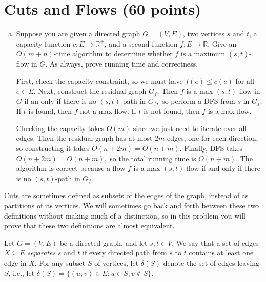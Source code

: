 \documentclass{article}
\begin{document}
\section{Cuts and Flows (60 points)}

\begin{enumerate}[(a)]
	\item Suppose you are given a directed graph $G = (V, E)$, two vertices $s$ and $t$, a capacity function $c: E \rightarrow \mathbb{R}^+$, and a second function $f : E \rightarrow \mathbb{R}$. Give an $O(m+n)$-time algorithm to determine whether $f$ is a maximum $(s,t)$-flow in $G$.  As always, prove running time and correctness.
		\begin{soln}
			First, check the capacity constraint, so we must have $f(e)\le c(e)$ for all $e\in E.$ Next, construct the residual graph $G_f.$ Then $f$ is a max $(s, t)$-flow in $G$ if an only if there is no $(s, t)$-path in $G_f,$ so perform a DFS from $s$ in $G_f.$ If $t$ is found, then $f$ not a max flow. If $t$ is not found, then $f$ is a max flow.

			Checking the capacity takes $O(m)$ since we just need to iterate over all edges. Then the residual graph has at most $2m$ edges, one for each direction, so constructing it takes $O(n+2m)=O(n+m).$ Finally, DFS takes $O(n+2m)=O(n+m),$ so the total running time is $O(n+m).$ The algorithm is correct because a flow $f$ is a max $(s, t)$-flow if and only if there is no $(s, t)$-path in $G_f.$
		\end{soln}

\end{enumerate}

Cuts are sometimes defined as subsets of the edges of the graph, instead of as partitions of its vertices. We will sometimes go back and forth between these two definitions without making much of a distinction, so in this problem you will prove that these two definitions are almost equivalent.

Let $G = (V, E)$ be a directed graph, and let $s,t \in V$.  We say that a set of edges $X \subseteq E$ \emph{separates} $s$ and $t$ if every directed path from $s$ to $t$ contains at least one edge in $X$.  For any subset $S$ of vertices, let $\delta(S)$ denote the set of edges leaving $S$, i.e., let $\delta(S) = \{(u,v) \in E : u \in S, v \not\in S\}$.  
\end{document}
